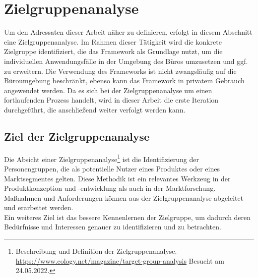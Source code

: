 \section{Zielgruppenanalyse}
\label{sec:zielgruppenanalyse}
    Um den Adressaten dieser Arbeit näher zu definieren, erfolgt in diesem Abschnitt eine Zielgruppenanalyse. %
    Im Rahmen dieser Tätigkeit wird die konkrete Zielgruppe identifiziert, die das Framework als Grundlage nutzt, um die individuellen 
    Anwendungsfälle in der Umgebung des Büros umzusetzen und ggf. zu erweitern. Die Verwendung des Frameworks ist nicht zwangsläufig auf die Büroumgebung beschränkt, ebenso kann 
    das Framework in privatem Gebrauch angewendet werden. Da es sich bei der Zielgruppenanalyse um einen fortlaufenden Prozess handelt, wird in dieser Arbeit die erste Iteration durchgeführt, 
    die anschließend weiter verfolgt werden kann. 
    
    \subsection{Ziel der Zielgruppenanalyse}
        Die Absicht einer Zielgruppenanalyse\footnote{Beschreibung und Definition der Zielgruppenanalyse. \url{https://www.eology.net/magazine/target-group-analysis} Besucht am 24.05.2022.} 
        ist die Identifizierung der Personengruppen, die als potentielle Nutzer eines Produktes 
        oder eines Marktsegmentes gelten. Diese Methodik ist ein relevantes Werkzeug in der Produktkonzeption und -entwicklung 
        als auch in der Marktforschung. Maßnahmen und Anforderungen können aus der Zielgruppenanalyse abgeleitet und 
        erarbeitet werden. 
        \\
        Ein weiteres Ziel ist das bessere Kennenlernen der Zielgruppe, um dadurch deren Bedürfnisse und Interessen 
        genauer zu identifizieren und zu betrachten. 
    
